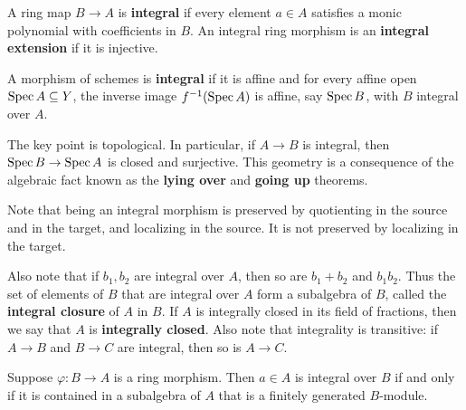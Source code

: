 \documentclass[12pt]{article}
\begin{document}
\begin{definition}
    A ring map $B\to A$ is \textbf{integral} if every element $a \in A$ satisfies a monic polynomial with coefficients in $B$. An integral ring morphism is an \textbf{integral extension} if it is injective.

    A morphism of schemes is \textbf{integral} if it is affine and for every affine open $\operatorname{Spec} A\subseteq Y$, the inverse image $f^{-1}(\operatorname{Spec} A)$ is affine, say $\operatorname{Spec} B$, with $B$ integral over $A$.
\end{definition}

The key point is topological. In particular, if $A \to B$ is integral, then $\operatorname{Spec} B \to \operatorname{Spec} A$
is closed and surjective. This geometry is a consequence of the algebraic fact known as the \textbf{lying over} and \textbf{going up} theorems.

Note that being an integral morphism is preserved by quotienting in the source and in the target, and localizing in the source. It is not preserved by localizing in the target.

Also note that if $b_1, b_2$ are integral over $A$, then so are $b_1+b_2$ and $b_1 b_2$. Thus the set of elements of $B$ that are integral over $A$ form a subalgebra of $B$, called the \textbf{integral closure} of $A$ in $B$. If $A$ is integrally closed in its field of fractions, then we say that $A$ is \textbf{integrally closed}. Also note that integrality is transitive: if $A\to B$ and $B\to C$ are integral, then so is $A\to C$.


\begin{lemma}
    Suppose $\varphi: B \to A$ is a ring morphism. Then $a \in A$ is integral over $B$ if and only if it is contained in a subalgebra of $A$ that is a finitely generated $B$-module.
\end{lemma}
\end{document}
